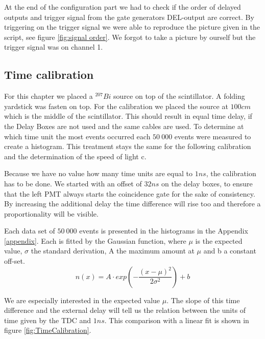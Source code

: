 \documentclass[]{article}
\begin{document}
At the end of the configuration part we had to check if the order of delayed outputs and trigger signal from the gate generators DEL-output are correct. By triggering on the trigger signal we were able to reproduce the picture given in the script, see figure \ref{fig:signal order}. We forgot to take a picture by ourself but the trigger signal was on channel 1.


\subsection{Time calibration}\label{time}
For this chapter we placed a $^{207}Bi$ source on top of the scintillator. A folding yardstick was fasten on top. For the calibration we placed the source at $100cm$ which is the middle of the scintillator. This should result in equal time delay, if the Delay Boxes are not used and the same cables are used. To determine at which time unit the most events occurred each $50\ 000$ events were measured to create a histogram. This treatment stays the same for the following calibration and the determination of the speed of light c.

Because we have no value how many time units are equal to $1ns$, the calibration has to be done. We started with an offset of $32ns$ on the delay boxes, to ensure that the left PMT always starts the coincidence gate for the sake of consistency. By increasing the additional delay the time difference will rise too and therefore a proportionality will be visible.

Each data set of $50\ 000$ events is presented in the histograms in the Appendix \ref{appendix}. Each is fitted by the Gaussian function, where $\mu$ is the expected value, $\sigma$ the standard derivation, A the maximum amount at $\mu$ and b a constant off-set. 
\begin{equation}
n(x) = A\cdot exp \left( -\frac{(x-\mu)^2}{2\sigma^2} \right) + b
\end{equation}

We are especially interested in the expected value $\mu$. The slope of this time difference and the external delay will tell us the relation between the units of time given by the TDC and $1ns$. This comparison with a linear fit is shown in figure \ref{fig:TimeCalibration}.
\end{document}
